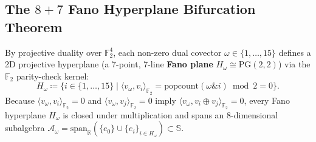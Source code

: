 \documentclass[11pt,a4paper]{article}
\theoremstyle{definition}
\theoremstyle{remark}
\newcommand{\R}{\mathbb{R}}
\newcommand{\Se}{\mathbb{S}}
\newcommand{\Ftwo}{\mathbb{F}_2}
\newcommand{\PG}{\mathrm{PG}}
\newcommand{\popcount}{\mathrm{popcount}}
\begin{document}
\subsection{The $8+7$ Fano Hyperplane Bifurcation Theorem}
By projective duality over $\Ftwo^4$, each non-zero dual covector $\omega \in \{1, \dots, 15\}$ defines a 2D projective hyperplane (a 7-point, 7-line \textbf{Fano plane} $H_\omega \cong \PG(2,2)$) via the $\Ftwo$ parity-check kernel:
\begin{equation}
\label{eq:fano_hyperplane}
H_\omega \coloneqq \big\{ i \in \{1, \dots, 15\} \;\big|\; \langle v_\omega, v_i \rangle_{\Ftwo} = \popcount(\omega \mathbin{\&} i) \bmod 2 = 0 \big\}.
\end{equation}
Because $\langle v_\omega, v_i \rangle_{\Ftwo} = 0$ and $\langle v_\omega, v_j \rangle_{\Ftwo} = 0$ imply $\langle v_\omega, v_i \oplus v_j \rangle_{\Ftwo} = 0$, every Fano hyperplane $H_\omega$ is closed under multiplication and spans an 8-dimensional subalgebra $\mathcal{A}_\omega = \mathrm{span}_{\R}(\{e_0\} \cup \{e_i\}_{i \in H_\omega}) \subset \Se$.
\end{document}
